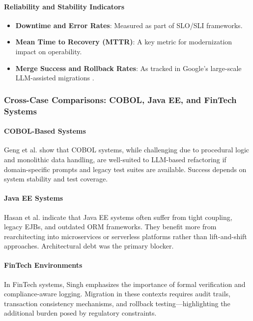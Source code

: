 \documentclass[12pt]{article}
\begin{document}
\paragraph{Reliability and Stability Indicators}

\begin{itemize}
    \item \textbf{Downtime and Error Rates}: Measured as part of SLO/SLI frameworks.
    \item \textbf{Mean Time to Recovery (MTTR)}: A key metric for modernization impact on operability.
    \item \textbf{Merge Success and Rollback Rates}: As tracked in Google’s large-scale LLM-assisted migrations \cite{googlemigrate2025}.
\end{itemize}

\vspace{0.5cm}
\subsubsection{Cross-Case Comparisons: COBOL, Java EE, and FinTech Systems}

\paragraph{COBOL-Based Systems}

Geng et al. \cite{geng2024} show that COBOL systems, while challenging due to procedural logic and monolithic data handling, are well-suited to LLM-based refactoring if domain-specific prompts and legacy test suites are available. Success depends on system stability and test coverage.

\paragraph{Java EE Systems}

Hasan et al. \cite{hasan2023} indicate that Java EE systems often suffer from tight coupling, legacy EJBs, and outdated ORM frameworks. They benefit more from rearchitecting into microservices or serverless platforms rather than lift-and-shift approaches. Architectural debt was the primary blocker.

\paragraph{FinTech Environments}

In FinTech systems, Singh \cite{singh2024} emphasizes the importance of formal verification and compliance-aware logging. Migration in these contexts requires audit trails, transaction consistency mechanisms, and rollback testing—highlighting the additional burden posed by regulatory constraints.
\end{document}
